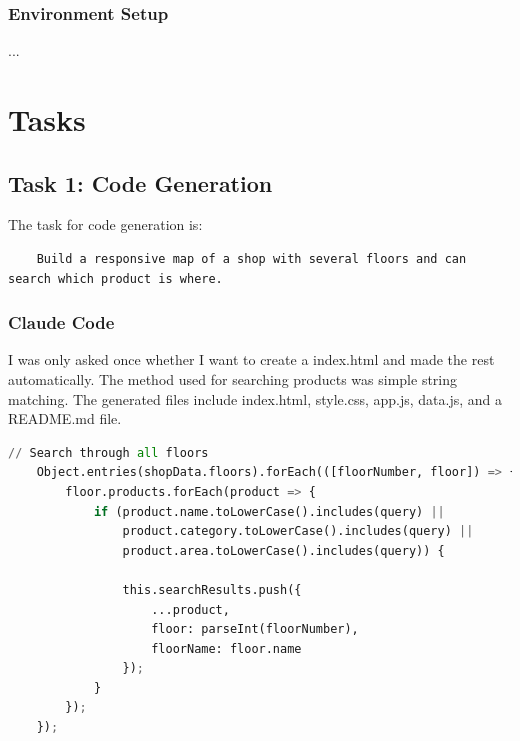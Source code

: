 \documentclass[10pt]{article}
\begin{document}
\subsubsection{Environment Setup}
...

\section{Tasks}
\subsection{Task 1: Code Generation}
The task for code generation is:
\begin{verbatim}
    Build a responsive map of a shop with several floors and can search which product is where.
\end{verbatim}
\subsubsection{Claude Code}
I was only asked once whether I want to create a index.html and made the rest automatically.
The method used for searching products was simple string matching.
The generated files include index.html, style.css, app.js, data.js, and a README.md file.
\begin{lstlisting}[language=python, caption={Claude Code's generated code for search task}]
    // Search through all floors
    Object.entries(shopData.floors).forEach(([floorNumber, floor]) => {
        floor.products.forEach(product => {
            if (product.name.toLowerCase().includes(query) || 
                product.category.toLowerCase().includes(query) ||
                product.area.toLowerCase().includes(query)) {
                
                this.searchResults.push({
                    ...product,
                    floor: parseInt(floorNumber),
                    floorName: floor.name
                });
            }
        });
    });
\end{lstlisting}
\end{document}
